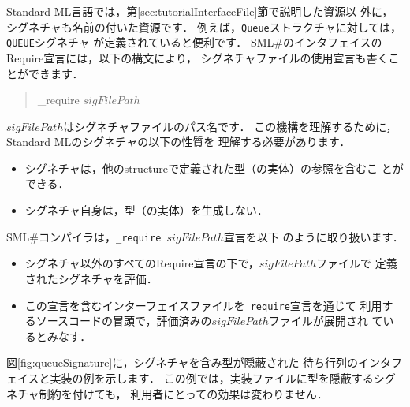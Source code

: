 \documentclass{jbook}
\newcommand{\smlsharp}{SML\#}
\newenvironment{program}{\begin{quote}\begin{tt}}%
                        {\end{tt}\end{quote}}
\begin{document}
\ifjp%
	Standard ML言語では，第\ref{sec:tutorialInterfaceFile}節で説明した資源以
外に，シグネチャも名前の付いた資源です．
	例えば，{\tt Queue}ストラクチャに対しては，{\tt QUEUE}シグネチャ
が定義されていると便利です．
	\smlsharp{}のインタフェイスのRequire宣言には，以下の構文により，
シグネチャファイルの使用宣言も書くことができます．
\begin{program}
\_require $sigFilePath$
\end{program}
	$sigFilePath$はシグネチャファイルのパス名です．
	この機構を理解するために，Standard MLのシグネチャの以下の性質を
理解する必要があります．
\begin{itemize}
\item シグネチャは，他のstructureで定義された型（の実体）の参照を含むこ
とができる．
\item シグネチャ自身は，型（の実体）を生成しない．
\end{itemize}
	\smlsharp{}コンパイラは，{\tt \_require $sigFilePath$}宣言を以下
のように取り扱います．
\begin{itemize}
\item シグネチャ以外のすべてのRequire宣言の下で，$sigFilePath$ファイルで
定義されたシグネチャを評価．
\item この宣言を含むインターフェイスファイルを{\tt \_require}宣言を通じて
利用するソースコードの冒頭で，評価済みの$sigFilePath$ファイルが展開され
ているとみなす．
\end{itemize}
	図\ref{fig:queueSignature}に，シグネチャを含み型が隠蔽された
待ち行列のインタフェイスと実装の例を示します．
	この例では，実装ファイルに型を隠蔽するシグネチャ制約を付けても，
利用者にとっての効果は変わりません．
\end{document}
